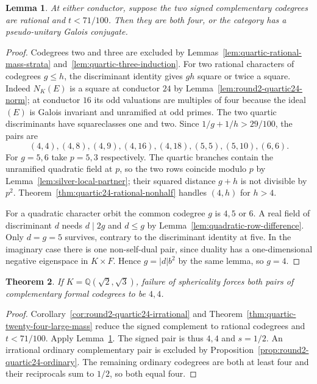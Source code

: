 \documentclass[11pt,reqno]{amsart}
\newtheorem{theorem}{Theorem}[section]
\newtheorem{lemma}[theorem]{Lemma}
\theoremstyle{remark}\newtheorem{remark}[theorem]{Remark}
\numberwithin{equation}{section}
\begin{document}
\begin{lemma}\label{lem:1624-rational-shortlist}
At either conductor, suppose the two signed complementary codegrees
are rational and $t<71/100$. Then they are both four, or the
category has a pseudo-unitary Galois conjugate.
\end{lemma}
\begin{proof}
Codegrees two and three are excluded by
Lemmas~\ref{lem:quartic-rational-mass-strata} and~\ref{lem:quartic-three-induction}.
For two rational characters of codegrees $g\le h$, the discriminant
identity gives $gh$ square or twice a square. Indeed $N_K(E)$ is a
square at conductor $24$ by Lemma~\ref{lem:round2-quartic24-norm};
at conductor $16$ its odd valuations are multiples of four because
the ideal $(E)$ is Galois invariant and unramified at odd primes.
The two quartic discriminants have squareclasses one and two.
Since $1/g+1/h>29/100$, the pairs are
\[
 (4,4),(4,8),(4,9),(4,16),(4,18),(5,5),(5,10),(6,6).
\]
For $g=5,6$ take $p=5,3$ respectively. The quartic branches contain
the unramified quadratic field at $p$, so the two rows coincide
modulo $p$ by Lemma~\ref{lem:silver-local-partner}; their squared
distance $g+h$ is not divisible by $p^2$. Theorem~\ref{thm:quartic24-rational-nonhalf}
handles $(4,h)$ for $h>4$.

For a quadratic character orbit the common codegree $g$ is $4,5$
or $6$. A real field of discriminant $d$ needs $d\mid2g$ and
$d\le g$ by Lemma~\ref{lem:quadratic-row-difference}. Only $d=g=5$
survives, contrary to the discriminant identity at five. In the
imaginary case there is one non-self-dual pair, since duality has a
one-dimensional negative eigenspace in $K\times F$. Hence $g=|d|b^2$
by the same lemma, so $g=4$.
\end{proof}

\begin{theorem}\label{thm:round2-quartic24-finite}
If $K=\mathbb Q(\sqrt2,\sqrt3)$, failure of sphericality forces both pairs of complementary formal codegrees to be $4,4$.
\end{theorem}
\begin{proof}
Corollary~\ref{cor:round2-quartic24-irrational} and
Theorem~\ref{thm:quartic-twenty-four-large-mass} reduce the signed
complement to rational codegrees and $t<71/100$.
Apply Lemma~\ref{lem:1624-rational-shortlist}.
The signed pair is thus $4,4$ and $s=1/2$. An irrational ordinary complementary pair is excluded by Proposition~\ref{prop:round2-quartic24-ordinary}. The remaining ordinary codegrees are both at least four and their reciprocals sum to $1/2$, so both equal four.
\end{proof}
\end{document}
